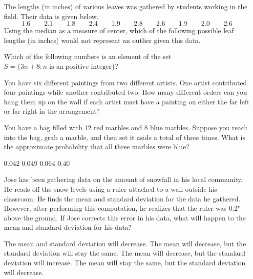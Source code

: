 \documentclass[12pt,letterpaper,answers]{exam}
\begin{document}
\begin{questions}
\vfill

\question The lengths (in inches) of various leaves was gathered by students working in the field. Their data is given below.
	\[
	1.6 \qquad 2.1 \qquad 1.8 \qquad 2.4 \qquad 1.9 \qquad 2.8 \qquad 2.6 \qquad 1.9 \qquad 2.0 \qquad 2.6
	\] 
Using the median as a measure of center, which of the following possible leaf lengths (in inches) would not represent an outlier given this data.
	\begin{choices}
	\end{choices}

\vfill

\question Which of the following numbers is an element of the set $S= \{ 3n + 8 \colon n \text{ is an positive integer} \}$?
	\begin{choices}
	\choice 2
	\choice 8
	\CorrectChoice 20
	\choice 25
	\end{choices}

\vfill

\question You have six different paintings from two different artists. One artist contributed four paintings while another contributed two. How many different orders can you hang them up on the wall if each artist must have a painting on either the far left or far right in the arrangement?
	\begin{choices}
	\choice 48
	\choice 192
	\CorrectChoice 384
	\choice 720
	\end{choices}



\newpage
\vfill



\question You have a bag filled with 12 red marbles and 8 blue marbles. Suppose you reach into the bag, grab a marble, and then set it aside a total of three times. What is the approximate probability that all three marbles were blue?
	\begin{choices}
	\choice $0.042$
	\CorrectChoice $\mathbf{0.049}$
	\choice $0.064$
	\choice $0.40$
	\end{choices}

\vfill

\question Jose has been gathering data on the amount of snowfall in his local community. He reads off the snow levels using a ruler attached to a wall outside his classroom. He finds the mean and standard deviation for the data he gathered. However, after performing this computation, he realizes that the ruler was 0.2" above the ground. If Jose corrects this error in his data, what will happen to the mean and standard deviation for his data?
	\begin{choices}
	\choice The mean and standard deviation will decrease.
	\CorrectChoice The mean will decrease, but the standard deviation will stay the same.
	\choice The mean will decrease, but the standard deviation will increase.
	\choice The mean will stay the same, but the standard deviation will decrease. 
	\end{choices}


\end{questions}
\end{document}
